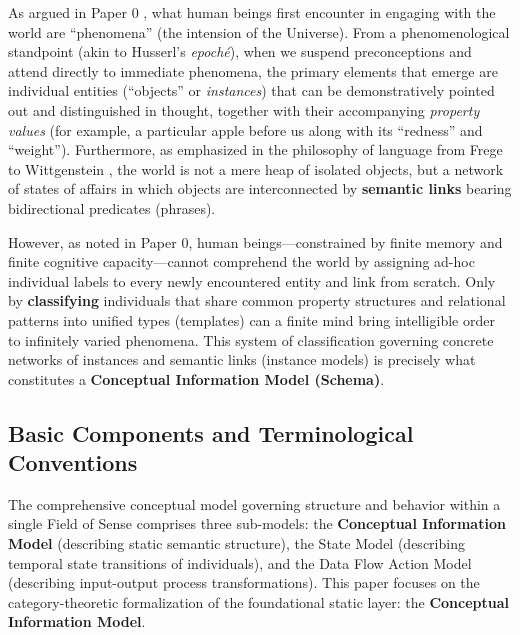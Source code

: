 \documentclass[11pt,a4paper]{article}
\theoremstyle{definition}
\theoremstyle{plain}
\theoremstyle{remark}
\begin{document}
As argued in Paper 0 \cite{ota2026paper0}, what human beings first encounter in engaging with the world are ``phenomena'' (the intension of the Universe). From a phenomenological standpoint (akin to Husserl's \emph{epoch\'e}), when we suspend preconceptions and attend directly to immediate phenomena, the primary elements that emerge are individual entities (``objects'' or \emph{instances}) that can be demonstratively pointed out and distinguished in thought, together with their accompanying \emph{property values} (for example, a particular apple before us along with its ``redness'' and ``weight''). Furthermore, as emphasized in the philosophy of language from Frege to Wittgenstein \cite{wittgenstein1922}, the world is not a mere heap of isolated objects, but a network of states of affairs in which objects are interconnected by \textbf{semantic links} bearing bidirectional predicates (phrases).

However, as noted in Paper 0, human beings---constrained by finite memory and finite cognitive capacity---cannot comprehend the world by assigning ad-hoc individual labels to every newly encountered entity and link from scratch. Only by \textbf{classifying} individuals that share common property structures and relational patterns into unified types (templates) can a finite mind bring intelligible order to infinitely varied phenomena. This system of classification governing concrete networks of instances and semantic links (instance models) is precisely what constitutes a \textbf{Conceptual Information Model (Schema)}.

\subsection{Basic Components and Terminological Conventions}
The comprehensive conceptual model governing structure and behavior within a single Field of Sense comprises three sub-models: the \textbf{Conceptual Information Model} (describing static semantic structure), the State Model (describing temporal state transitions of individuals), and the Data Flow Action Model (describing input-output process transformations). This paper focuses on the category-theoretic formalization of the foundational static layer: the \textbf{Conceptual Information Model}.
\end{document}
